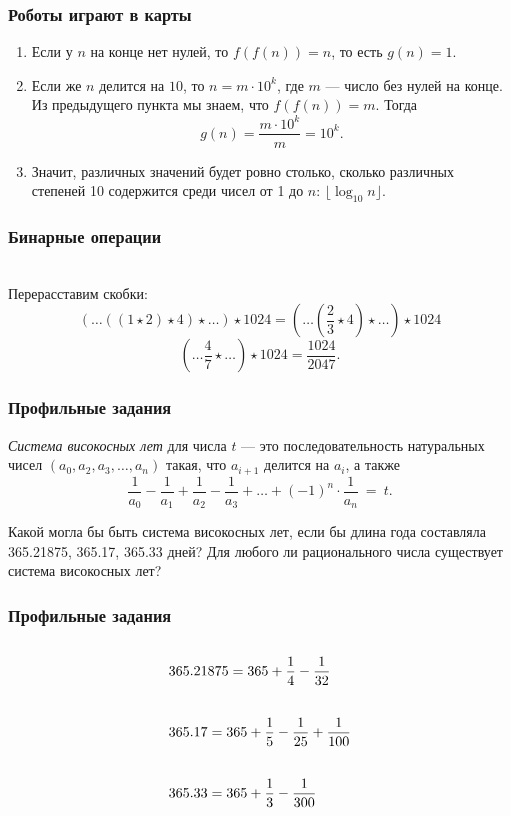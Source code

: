 \documentclass[aspectratio=1610,12pt,notheorems]{beamer}
\begin{document}
\begin{frame}\frametitle{Роботы играют в карты}
\begin{enumerate}
	\item Если у $n$ на конце нет нулей, то $f\left(f(n)\right) = n$, то есть $g(n) = 1$. \pause
	\item Если же $n$ делится на $10$, то $n = m\cdot10^k$, где $m$ --- число без нулей на конце. Из предыдущего пункта мы знаем, что $f\left(f(n)\right) = m$. Тогда $$g(n) = \frac{ m\cdot10^k}{m} = 10^k.$$ \pause
	\item Значит, различных значений будет ровно столько, сколько различных степеней 10 содержится среди чисел от 1 до $n$: $\lfloor \log_{10}n \rfloor$.
\end{enumerate}
\end{frame}

\begin{frame}\frametitle{Бинарные операции}
\ \\ 
Перерасставим скобки:
	\[ (\ldots((1\star2)\star4)\star\ldots)\star1024 = \left(\ldots\left(\frac{2}{3}\star4\right)\star\ldots\right)\star1024 \]
	\[ \left(\ldots\frac{4}{7}\star\ldots\right)\star1024 = \frac{1024}{2047}.\]
\end{frame}

\begin{frame} \frametitle{Профильные задания}
{\it Система високосных лет} для числа $t$ — это последовательность натуральных чисел $(a_0, a_2, a_3, \ldots, a_n)$ такая, что $a_{i+1}$ делится на $a_i$, а также
	$$\frac{1}{a_0} - \frac{1}{a_1} + \frac{1}{a_2} - \frac{1}{a_3} + \ldots
	     + (-1)^{n} \cdot \frac{1}{a_n}\ =\ t.$$ \smallskip

Какой могла бы быть система високосных лет, если бы длина года составляла 365.21875, 365.17, 365.33 дней? Для любого ли рационального числа существует система високосных лет?
\end{frame}

\begin{frame} \frametitle{Профильные задания}

\begin{align*}
	& 365.21875 = 365 + \frac{1}{4} - \frac{1}{32}
		\vphantom{\int\limits_{0_0}^{0^0}} \\
	& 365.17 = 365 + \frac{1}{5} - \frac{1}{25} + \frac{1}{100}
		\vphantom{\int\limits_{0_0}^{0^0}} \\
	& 365.33 = 365 + \frac{1}{3} - \frac{1}{300}
		\vphantom{\int\limits_{0_0}^{0^0}} \\
\end{align*}

\end{frame}
\end{document}
